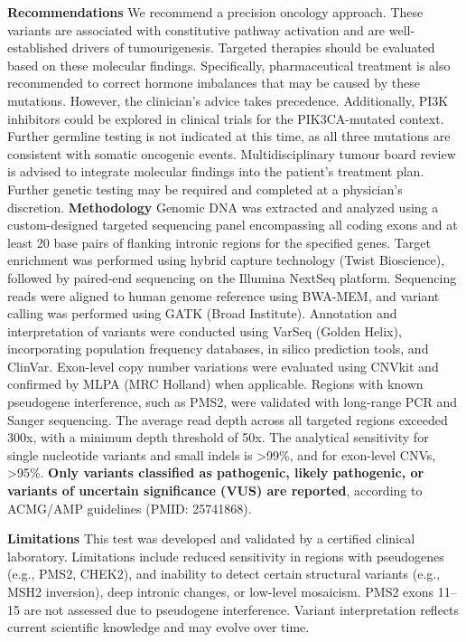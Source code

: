 \documentclass[11pt]{extarticle}
\newcommand{\data}[1]{}
\begin{document}
{\Large \bf Recommendations \newline}
We recommend a precision oncology approach. These variants are associated with constitutive pathway activation and are well-established drivers of tumourigenesis. Targeted therapies should be evaluated based on these molecular findings. Specifically, pharmaceutical treatment is also recommended to correct hormone imbalances that may be caused by these mutations. However, the clinician's advice takes precedence. Additionally, PI3K inhibitors could be explored in clinical trials for the PIK3CA-mutated context. Further germline testing is not indicated at this time, as all three mutations are consistent with somatic oncogenic events. Multidisciplinary tumour board review is advised to integrate molecular findings into the patient's treatment plan. Further genetic testing may be required and completed at a physician's discretion. 
\newline 
\newline
{\Large \bf Methodology} \newline
Genomic DNA was extracted and analyzed using a custom-designed targeted sequencing panel encompassing all coding exons and at least 20 base pairs of flanking intronic regions for the specified genes. Target enrichment was performed using hybrid capture technology (Twist Bioscience), followed by paired-end sequencing on the Illumina NextSeq platform. Sequencing reads were aligned to \data{reference_genome} human genome reference using BWA-MEM, and variant calling was performed using GATK (Broad Institute). Annotation and interpretation of variants were conducted using VarSeq (Golden Helix), incorporating population frequency databases, in silico prediction tools, and ClinVar. Exon-level copy number variations were evaluated using CNVkit and confirmed by MLPA (MRC Holland) when applicable. Regions with known pseudogene interference, such as PMS2, were validated with long-range PCR and Sanger sequencing. The average read depth across all targeted regions exceeded 300x, with a minimum depth threshold of 50x. The analytical sensitivity for single nucleotide variants and small indels is >99\%, and for exon-level CNVs, >95\%. {\bf Only variants classified as pathogenic, likely pathogenic, or variants of uncertain significance (VUS) are reported}, according to ACMG/AMP guidelines (PMID: 25741868).


{\large \bf Limitations \newline}
This test was developed and validated by a certified clinical laboratory. Limitations include reduced sensitivity in regions with pseudogenes (e.g., PMS2, CHEK2), and inability to detect certain structural variants (e.g., MSH2 inversion), deep intronic changes, or low-level mosaicism. PMS2 exons 11–15 are not assessed due to pseudogene interference. Variant interpretation reflects current scientific knowledge and may evolve over time.
\end{document}
